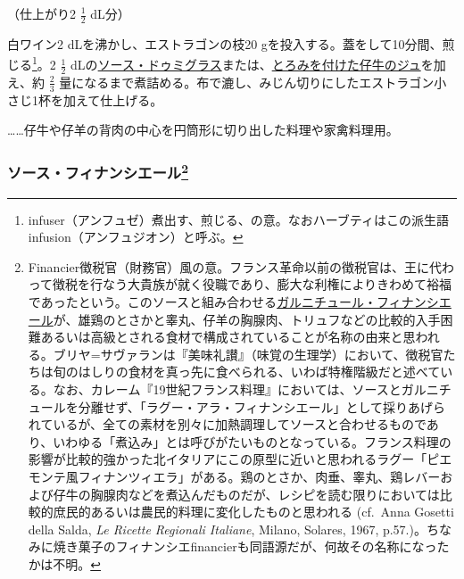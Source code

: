 \begin{recette}

 

（仕上がり2 \(\frac{1}{2}\) dL分）

白ワイン2 dLを沸かし、エストラゴンの枝20
gを投入する。蓋をして10分間、煎じる\footnote{infuser（アンフュゼ）煮出す、煎じる、の意。なおハーブティはこの派生語infusion（アンフュジオン）と呼ぶ。}。2
\(\frac{1}{2}\)
dLの\protect\hyperlink{sauce-demi-glace}{ソース・ドゥミグラス}または、\protect\hyperlink{jus-de-veau-lie}{とろみを付けた仔牛のジュ}を加え、約
\(\frac{2}{3}\)
量になるまで煮詰める。布で漉し、みじん切りにしたエストラゴン小さじ1杯を加えて仕上げる。

\ldots{}\ldots{}仔牛や仔羊の背肉の中心を円筒形に切り出した料理や家禽料理用。

\atoaki{}

\hypertarget{sauce-financiere}{%
\subsubsection[ソース・フィナンシエール]{\texorpdfstring{ソース・フィナンシエール\footnote{Financier徴税官（財務官）風の意。フランス革命以前の徴税官は、王に代わって徴税を行なう大貴族が就く役職であり、膨大な利権によりきわめて裕福であったという。このソースと組み合わせる\protect\hyperlink{garniture-financiere}{ガルニチュール・フィナンシエール}が、雄鶏のとさかと睾丸、仔羊の胸腺肉、トリュフなどの比較的入手困難あるいは高級とされる食材で構成されていることが名称の由来と思われる。ブリヤ=サヴァランは『美味礼讃』（味覚の生理学）において、徴税官たちは旬のはしりの食材を真っ先に食べられる、いわば特権階級だと述べている。なお、カレーム『19世紀フランス料理』においては、ソースとガルニチュールを分離せず、「ラグー・アラ・フィナンシエール」として採りあげられているが、全ての素材を別々に加熱調理してソースと合わせるものであり、いわゆる「煮込み」とは呼びがたいものとなっている。フランス料理の影響が比較的強かった北イタリアにこの原型に近いと思われるラグー「ピエモンテ風フィナンツィエラ」がある。鶏のとさか、肉垂、睾丸、鶏レバーおよび仔牛の胸腺肉などを煮込んだものだが、レシピを読む限りにおいては比較的庶民的あるいは農民的料理に変化したものと思われる
  (cf.~Anna Gosetti della Salda, \emph{Le Ricette Regionali Italiane},
  Milano, Solares, 1967,
  p.57.)。ちなみに焼き菓子のフィナンシエfinancierも同語源だが、何故その名称になったかは不明。}}{ソース・フィナンシエール}}\label{sauce-financiere}}


\end{recette}

